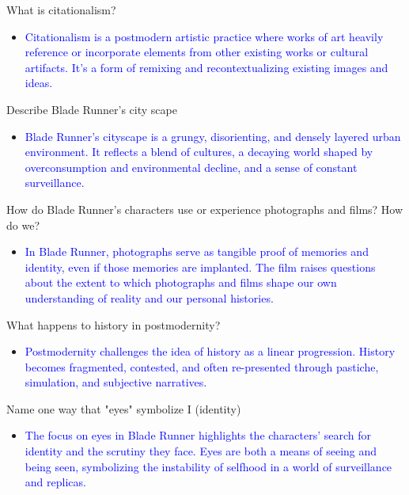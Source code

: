 \documentclass[11pt,fleqn]{book} %
\begin{document}
\begin{exercise}
What is citationalism?
\begin{itemize}
    \item \textcolor{blue}{Citationalism is a postmodern artistic practice where works of art heavily reference or incorporate elements from other existing works or cultural artifacts. It's a form of remixing and recontextualizing existing images and ideas.}
\end{itemize}
\end{exercise}

\begin{exercise}
Describe Blade Runner's city scape
\begin{itemize}
\item \textcolor{blue}{Blade Runner's cityscape is a grungy, disorienting, and densely layered urban environment. It reflects a blend of cultures,  a decaying world shaped by overconsumption and environmental decline, and a sense of constant surveillance. }
\end{itemize}
\end{exercise}

\begin{exercise}
How do Blade Runner's characters use or experience photographs and films? How do we?
\begin{itemize}
\item \textcolor{blue}{In Blade Runner, photographs serve as tangible proof of memories and identity, even if those memories are implanted. The film raises questions about the extent to which photographs and films shape our own understanding of reality and our personal histories. }
\end{itemize}
\end{exercise}

\begin{exercise}
What happens to history in postmodernity?
\begin{itemize}
\item \textcolor{blue}{Postmodernity challenges the idea of history as a linear progression. History becomes fragmented, contested, and often re-presented through pastiche, simulation, and subjective narratives.}
\end{itemize}
\end{exercise}

\begin{exercise}
Name one way that "eyes" symbolize I (identity)
\begin{itemize}
    \item \textcolor{blue}{The focus on eyes in Blade Runner highlights the characters' search for identity and the scrutiny they face. Eyes are both a means of seeing and being seen, symbolizing the instability of selfhood in a world of surveillance and replicas.}
\end{itemize}
\end{exercise}
\end{document}
